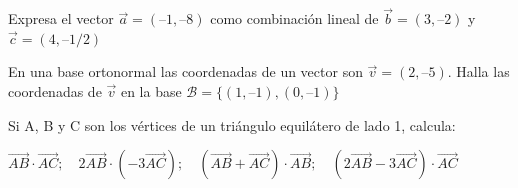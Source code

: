 \begin{mipropuesto}

Expresa el vector $\vec a =(–1, –8)$ como combinación lineal de $\vec b =(3, –2)$ y  $\vec c =(4, – 1/2)$	
\end{mipropuesto}

\vspace{-8mm}
\begin{flushright}
\begin{footnotesize} \textcolor{gris}{}	\end{footnotesize}
\end{flushright}


\begin{mipropuesto}

En una base ortonormal las coordenadas de un vector son $\vec v =(2, –5)$. Halla las coordenadas de $\vec v$ en la base $\mathcal B = \{(1, –1), (0, –1)\}$
\end{mipropuesto}

\vspace{-8mm}
\begin{flushright}
\begin{footnotesize} \textcolor{gris}{}	\end{footnotesize}
\end{flushright}



\begin{mipropuesto}

Si A, B y C son los vértices de un triángulo equilátero de lado 1, calcula: 

\vspace{2mm}$ \overrightarrow{AB} \cdot \overrightarrow{AC};\quad 2 \overrightarrow{AB} \cdot  (-3 \overrightarrow{AC} );\quad  (\overrightarrow{AB} + \overrightarrow{AC})\cdot \overrightarrow{AB};\quad (2\overrightarrow{AB}-3\overrightarrow{AC})\cdot \overrightarrow{AC}$
\end{mipropuesto}

\vspace{-8mm}
\begin{flushright}
\begin{footnotesize} \textcolor{gris}{}	\end{footnotesize}
\end{flushright}




